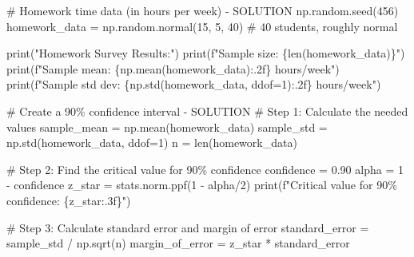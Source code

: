 \documentclass[
  letterpaper,
  DIV=11,
  numbers=noendperiod]{scrartcl}
\newenvironment{Shaded}{\begin{snugshade}}{\end{snugshade}}
\newcommand{\BuiltInTok}[1]{\textcolor[rgb]{0.00,0.23,0.31}{#1}}
\newcommand{\CommentTok}[1]{\textcolor[rgb]{0.37,0.37,0.37}{#1}}
\newcommand{\DecValTok}[1]{\textcolor[rgb]{0.68,0.00,0.00}{#1}}
\newcommand{\FloatTok}[1]{\textcolor[rgb]{0.68,0.00,0.00}{#1}}
\newcommand{\NormalTok}[1]{\textcolor[rgb]{0.00,0.23,0.31}{#1}}
\newcommand{\OperatorTok}[1]{\textcolor[rgb]{0.37,0.37,0.37}{#1}}
\newcommand{\SpecialCharTok}[1]{\textcolor[rgb]{0.37,0.37,0.37}{#1}}
\newcommand{\SpecialStringTok}[1]{\textcolor[rgb]{0.13,0.47,0.30}{#1}}
\newcommand{\StringTok}[1]{\textcolor[rgb]{0.13,0.47,0.30}{#1}}
\begin{document}
\begin{Shaded}
\begin{Highlighting}[]
\CommentTok{\# Homework time data (in hours per week) {-} SOLUTION}
\NormalTok{np.random.seed(}\DecValTok{456}\NormalTok{)}
\NormalTok{homework\_data }\OperatorTok{=}\NormalTok{ np.random.normal(}\DecValTok{15}\NormalTok{, }\DecValTok{5}\NormalTok{, }\DecValTok{40}\NormalTok{)  }\CommentTok{\# 40 students, roughly normal}

\BuiltInTok{print}\NormalTok{(}\StringTok{"Homework Survey Results:"}\NormalTok{)}
\BuiltInTok{print}\NormalTok{(}\SpecialStringTok{f"Sample size: }\SpecialCharTok{\{}\BuiltInTok{len}\NormalTok{(homework\_data)}\SpecialCharTok{\}}\SpecialStringTok{"}\NormalTok{)}
\BuiltInTok{print}\NormalTok{(}\SpecialStringTok{f"Sample mean: }\SpecialCharTok{\{}\NormalTok{np}\SpecialCharTok{.}\NormalTok{mean(homework\_data)}\SpecialCharTok{:.2f\}}\SpecialStringTok{ hours/week"}\NormalTok{)}
\BuiltInTok{print}\NormalTok{(}\SpecialStringTok{f"Sample std dev: }\SpecialCharTok{\{}\NormalTok{np}\SpecialCharTok{.}\NormalTok{std(homework\_data, ddof}\OperatorTok{=}\DecValTok{1}\NormalTok{)}\SpecialCharTok{:.2f\}}\SpecialStringTok{ hours/week"}\NormalTok{)}

\CommentTok{\# Create a 90\% confidence interval {-} SOLUTION}
\CommentTok{\# Step 1: Calculate the needed values}
\NormalTok{sample\_mean }\OperatorTok{=}\NormalTok{ np.mean(homework\_data)}
\NormalTok{sample\_std }\OperatorTok{=}\NormalTok{ np.std(homework\_data, ddof}\OperatorTok{=}\DecValTok{1}\NormalTok{)}
\NormalTok{n }\OperatorTok{=} \BuiltInTok{len}\NormalTok{(homework\_data)}

\CommentTok{\# Step 2: Find the critical value for 90\% confidence}
\NormalTok{confidence }\OperatorTok{=} \FloatTok{0.90}
\NormalTok{alpha }\OperatorTok{=} \DecValTok{1} \OperatorTok{{-}}\NormalTok{ confidence}
\NormalTok{z\_star }\OperatorTok{=}\NormalTok{ stats.norm.ppf(}\DecValTok{1} \OperatorTok{{-}}\NormalTok{ alpha}\OperatorTok{/}\DecValTok{2}\NormalTok{)}
\BuiltInTok{print}\NormalTok{(}\SpecialStringTok{f"Critical value for 90\% confidence: }\SpecialCharTok{\{}\NormalTok{z\_star}\SpecialCharTok{:.3f\}}\SpecialStringTok{"}\NormalTok{)}

\CommentTok{\# Step 3: Calculate standard error and margin of error}
\NormalTok{standard\_error }\OperatorTok{=}\NormalTok{ sample\_std }\OperatorTok{/}\NormalTok{ np.sqrt(n)}
\NormalTok{margin\_of\_error }\OperatorTok{=}\NormalTok{ z\_star }\OperatorTok{*}\NormalTok{ standard\_error}


\end{Highlighting}
\end{Shaded}
\end{document}
